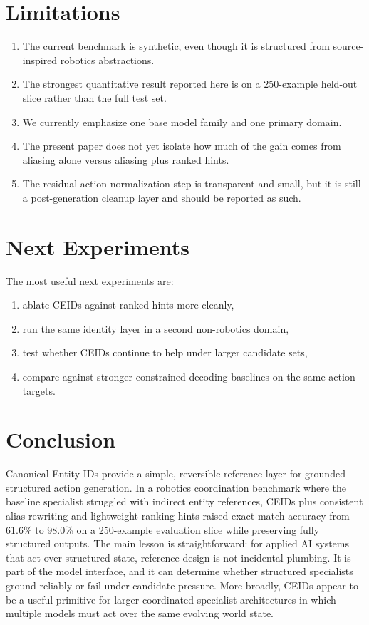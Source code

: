 \documentclass[11pt]{article}
\begin{document}
\section{Limitations}
\begin{enumerate}[leftmargin=*,itemsep=0.25em]
  \item The current benchmark is synthetic, even though it is structured from source-inspired robotics abstractions.
  \item The strongest quantitative result reported here is on a 250-example held-out slice rather than the full test set.
  \item We currently emphasize one base model family and one primary domain.
  \item The present paper does not yet isolate how much of the gain comes from aliasing alone versus aliasing plus ranked hints.
  \item The residual action normalization step is transparent and small, but it is still a post-generation cleanup layer and should be reported as such.
\end{enumerate}

\section{Next Experiments}
The most useful next experiments are:
\begin{enumerate}[leftmargin=*,itemsep=0.25em]
  \item ablate CEIDs against ranked hints more cleanly,
  \item run the same identity layer in a second non-robotics domain,
  \item test whether CEIDs continue to help under larger candidate sets,
  \item compare against stronger constrained-decoding baselines on the same action targets.
\end{enumerate}

\section{Conclusion}
Canonical Entity IDs provide a simple, reversible reference layer for grounded structured action generation. In a robotics coordination benchmark where the baseline specialist struggled with indirect entity references, CEIDs plus consistent alias rewriting and lightweight ranking hints raised exact-match accuracy from 61.6\% to 98.0\% on a 250-example evaluation slice while preserving fully structured outputs. The main lesson is straightforward: for applied AI systems that act over structured state, reference design is not incidental plumbing. It is part of the model interface, and it can determine whether structured specialists ground reliably or fail under candidate pressure. More broadly, CEIDs appear to be a useful primitive for larger coordinated specialist architectures in which multiple models must act over the same evolving world state.



\end{document}
